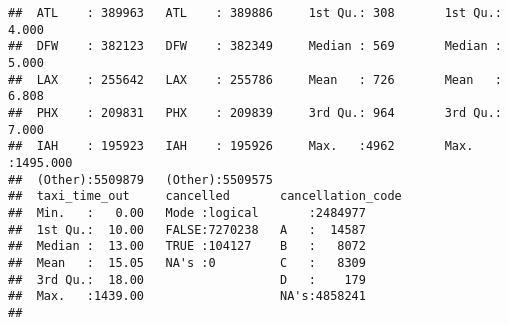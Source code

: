 \documentclass{article}\usepackage[]{graphicx}\usepackage[]{color}
\makeatletter
\newenvironment{kframe}{%
 \def\at@end@of@kframe{}%
 \ifinner\ifhmode%
  \def\at@end@of@kframe{\end{minipage}}%
  \begin{minipage}{\columnwidth}%
 \fi\fi%
 \def\FrameCommand##1{\hskip\@totalleftmargin \hskip-\fboxsep
 \colorbox{shadecolor}{##1}\hskip-\fboxsep
     \hskip-\linewidth \hskip-\@totalleftmargin \hskip\columnwidth}%
 \MakeFramed {\advance\hsize-\width
   \@totalleftmargin\z@ \linewidth\hsize
   \@setminipage}}%
 {\par\unskip\endMakeFramed%
 \at@end@of@kframe}
\newenvironment{knitrout}{}{} %
\makeatother
\begin{document}
\begin{knitrout}
\begin{kframe}
\begin{verbatim}
##  ATL    : 389963   ATL    : 389886     1st Qu.: 308       1st Qu.:   4.000  
##  DFW    : 382123   DFW    : 382349     Median : 569       Median :   5.000  
##  LAX    : 255642   LAX    : 255786     Mean   : 726       Mean   :   6.808  
##  PHX    : 209831   PHX    : 209839     3rd Qu.: 964       3rd Qu.:   7.000  
##  IAH    : 195923   IAH    : 195926     Max.   :4962       Max.   :1495.000  
##  (Other):5509879   (Other):5509575                                          
##  taxi_time_out     cancelled       cancellation_code
##  Min.   :   0.00   Mode :logical       :2484977     
##  1st Qu.:  10.00   FALSE:7270238   A   :  14587     
##  Median :  13.00   TRUE :104127    B   :   8072     
##  Mean   :  15.05   NA's :0         C   :   8309     
##  3rd Qu.:  18.00                   D   :    179     
##  Max.   :1439.00                   NA's:4858241     
## 
\end{verbatim}
\end{kframe}
\end{knitrout}
\end{document}
